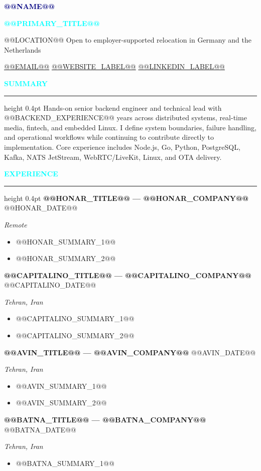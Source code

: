 \documentclass[10pt,a4paper]{article}
\newcommand{\sectiontitle}[1]{\vspace{0.42em}\textcolor{cyan}{\textsf{\bfseries\fontsize{9}{10}\selectfont #1}}\par\vspace{0.08em}\hrule height 0.4pt\vspace{0.2em}}
\newcommand{\role}[3]{\vspace{0.08em}\textbf{#1} \hfill \textcolor{muted}{#2}\par\textit{#3}\par}
\begin{document}
\fontsize{10.15}{12.2}\selectfont

{\fontsize{22}{24}\selectfont\textcolor{navy}{\textbf{@@NAME@@}}}\par
\vspace{0.02em}
{\fontsize{12.2}{14}\selectfont\textcolor{cyan}{\textbf{@@PRIMARY_TITLE@@}}}\par
\vspace{0.09em}
\textcolor{muted}{@@LOCATION@@ \textbar{} Open to employer-supported relocation in Germany and the Netherlands}\par
\href{mailto:@@EMAIL@@}{@@EMAIL@@} \textbar{} \href{@@WEBSITE_URL@@}{@@WEBSITE_LABEL@@} \textbar{} \href{@@LINKEDIN_URL@@}{@@LINKEDIN_LABEL@@}\par

\sectiontitle{SUMMARY}
Hands-on senior backend engineer and technical lead with @@BACKEND_EXPERIENCE@@ years across distributed systems, real-time media, fintech, and embedded Linux. I define system boundaries, failure handling, and operational workflows while continuing to contribute directly to implementation. Core experience includes Node.js, Go, Python, PostgreSQL, Kafka, NATS JetStream, WebRTC/LiveKit, Linux, and OTA delivery.

\sectiontitle{EXPERIENCE}
\role{@@HONAR_TITLE@@ --- @@HONAR_COMPANY@@}{@@HONAR_DATE@@}{Remote}
\begin{itemize}
  \item @@HONAR_SUMMARY_1@@
  \item @@HONAR_SUMMARY_2@@
\end{itemize}

\role{@@CAPITALINO_TITLE@@ --- @@CAPITALINO_COMPANY@@}{@@CAPITALINO_DATE@@}{Tehran, Iran}
\begin{itemize}
  \item @@CAPITALINO_SUMMARY_1@@
  \item @@CAPITALINO_SUMMARY_2@@
\end{itemize}

\role{@@AVIN_TITLE@@ --- @@AVIN_COMPANY@@}{@@AVIN_DATE@@}{Tehran, Iran}
\begin{itemize}
  \item @@AVIN_SUMMARY_1@@
  \item @@AVIN_SUMMARY_2@@
\end{itemize}

\role{@@BATNA_TITLE@@ --- @@BATNA_COMPANY@@}{@@BATNA_DATE@@}{Tehran, Iran}
\begin{itemize}
  \item @@BATNA_SUMMARY_1@@
\end{itemize}
\end{document}
